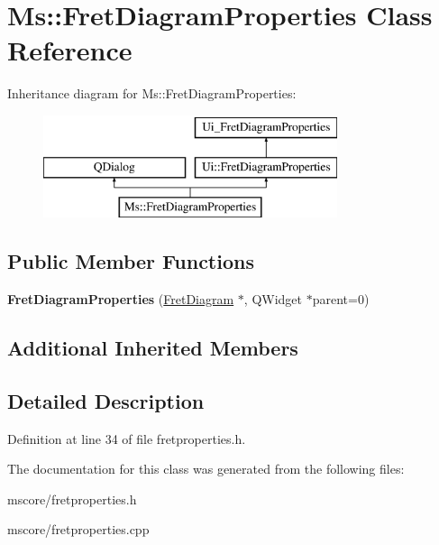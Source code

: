 \hypertarget{class_ms_1_1_fret_diagram_properties}{}\section{Ms\+:\+:Fret\+Diagram\+Properties Class Reference}
\label{class_ms_1_1_fret_diagram_properties}
Inheritance diagram for Ms\+:\+:Fret\+Diagram\+Properties\+:\begin{figure}[H]
\begin{center}
\leavevmode
\includegraphics[height=3.000000cm]{class_ms_1_1_fret_diagram_properties}
\end{center}
\end{figure}
\subsection*{Public Member Functions}
\begin{DoxyCompactItemize}
\item 
\mbox{\label{class_ms_1_1_fret_diagram_properties_ae046974b41f14bba1e3af1c05dfc085e}} 
{\bfseries Fret\+Diagram\+Properties} (\hyperlink{class_ms_1_1_fret_diagram}{Fret\+Diagram} $\ast$, Q\+Widget $\ast$parent=0)
\end{DoxyCompactItemize}
\subsection*{Additional Inherited Members}


\subsection{Detailed Description}


Definition at line 34 of file fretproperties.\+h.



The documentation for this class was generated from the following files\+:\begin{DoxyCompactItemize}
\item 
mscore/fretproperties.\+h\item 
mscore/fretproperties.\+cpp\end{DoxyCompactItemize}
